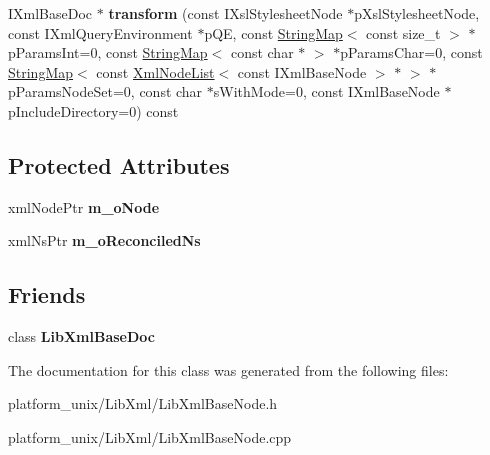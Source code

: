 \begin{DoxyCompactItemize}
\item 
\hypertarget{classgeneral__server_1_1LibXmlBaseNode_a49f3f2c3dd844190c5ad7c59bdd0bb0c}{\-I\-Xml\-Base\-Doc $\ast$ {\bfseries transform} (const \-I\-Xsl\-Stylesheet\-Node $\ast$p\-Xsl\-Stylesheet\-Node, const \-I\-Xml\-Query\-Environment $\ast$p\-Q\-E, const \hyperlink{classgeneral__server_1_1StringMap}{\-String\-Map}$<$ const size\-\_\-t $>$ $\ast$p\-Params\-Int=0, const \hyperlink{classgeneral__server_1_1StringMap}{\-String\-Map}$<$ const char $\ast$ $>$ $\ast$p\-Params\-Char=0, const \hyperlink{classgeneral__server_1_1StringMap}{\-String\-Map}$<$ const \hyperlink{classgeneral__server_1_1XmlNodeList}{\-Xml\-Node\-List}$<$ const \-I\-Xml\-Base\-Node $>$ $\ast$ $>$ $\ast$p\-Params\-Node\-Set=0, const char $\ast$s\-With\-Mode=0, const \-I\-Xml\-Base\-Node $\ast$p\-Include\-Directory=0) const }\label{classgeneral__server_1_1LibXmlBaseNode_a49f3f2c3dd844190c5ad7c59bdd0bb0c}

\end{DoxyCompactItemize}
\subsection*{\-Protected \-Attributes}
\begin{DoxyCompactItemize}
\item 
\hypertarget{classgeneral__server_1_1LibXmlBaseNode_a87b7cb778336674a7d4176424283859c}{xml\-Node\-Ptr {\bfseries m\-\_\-o\-Node}}\label{classgeneral__server_1_1LibXmlBaseNode_a87b7cb778336674a7d4176424283859c}

\item 
\hypertarget{classgeneral__server_1_1LibXmlBaseNode_a281fe5355f9143a287c1107a53864a95}{xml\-Ns\-Ptr {\bfseries m\-\_\-o\-Reconciled\-Ns}}\label{classgeneral__server_1_1LibXmlBaseNode_a281fe5355f9143a287c1107a53864a95}

\end{DoxyCompactItemize}
\subsection*{\-Friends}
\begin{DoxyCompactItemize}
\item 
\hypertarget{classgeneral__server_1_1LibXmlBaseNode_ad45b246ca776b762c0a749596bea7369}{class {\bfseries \-Lib\-Xml\-Base\-Doc}}\label{classgeneral__server_1_1LibXmlBaseNode_ad45b246ca776b762c0a749596bea7369}

\end{DoxyCompactItemize}


\-The documentation for this class was generated from the following files\-:\begin{DoxyCompactItemize}
\item 
platform\-\_\-unix/\-Lib\-Xml/\-Lib\-Xml\-Base\-Node.\-h\item 
platform\-\_\-unix/\-Lib\-Xml/\-Lib\-Xml\-Base\-Node.\-cpp\end{DoxyCompactItemize}
